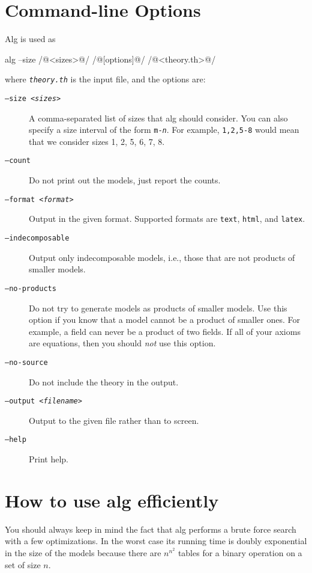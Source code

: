 \documentclass{report}
\begin{document}
\chapter{Command-line Options}
\label{sec:command-line-options}

Alg is used as
%
\begin{shell}
alg --size /@<sizes>@/ /@[options]@/ /@<theory.th>@/
\end{shell}
%
where \texttt{\textit{theory.th}} is the input file, and the options are:
%
\begin{description}
\item[\texttt{--size \textit{<sizes>}}]
  A comma-separated list of sizes that alg should consider. You can
  also specify a size interval of the form
  \texttt{\texttt{m}-\textit{n}}. For example, \texttt{1,2,5-8} would
  mean that we consider sizes 1, 2, 5, 6, 7, 8.
\item[\texttt{--count}]
  Do not print out the models, just report the counts.
\item[\texttt{--format \textit{<format>}}]
  Output in the given format. Supported formats are \texttt{text},
  \texttt{html}, and \texttt{latex}.
\item[\texttt{--indecomposable}]
  Output only indecomposable models, i.e., those that are not products
  of smaller models.
\item[\texttt{--no-products}]
  Do not try to generate models as products of smaller models. Use
  this option if you know that a model cannot be a product of smaller
  ones. For example, a field can never be a product of two fields. If
  all of your axioms are equations, then you should \emph{not} use
  this option.
\item[\texttt{--no-source}]
  Do not include the theory in the output.
\item[\texttt{--output \textit{<filename>}}]
  Output to the given file rather than to screen.
\item[\texttt{--help}]
  Print help.
\end{description}

\chapter{How to use alg efficiently}
\label{sec:optimization}

You should always keep in mind the fact that alg performs a brute
force search with a few optimizations. In the worst case its running
time is doubly exponential in the size of the models because there are
$n^{n^2}$ tables for a binary operation on a set of size $n$.
\end{document}
